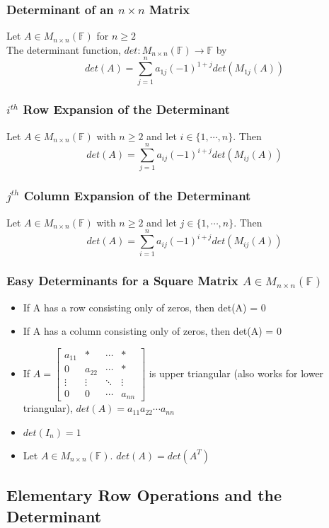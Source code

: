 \documentclass[12pt, letterpaper]{article}
\begin{document}
\subsubsection{Determinant of an $n\times n$ Matrix}
Let $A\in M_{n\times n}(\mathbb{F})$ for $n\geq2$ \\
The determinant function, $det: M_{n\times n}(\mathbb{F})\rightarrow\mathbb{F}$ by 
\[det(A) = \sum_{j=1}^{n}a_{1j}(-1)^{1+j}det(M_{1j}(A))\]
\subsubsection{$i^{th}$ Row Expansion of the Determinant}
Let $A\in M_{n\times n}(\mathbb{F})$ with $n\geq2$ and let $i\in\{1,\cdots,n\}$. Then
\[det(A) = \sum_{j=1}^{n}a_{ij}(-1)^{i+j}det(M_{ij}(A))\]
\subsubsection{$j^{th}$ Column Expansion of the Determinant}
Let $A\in M_{n\times n}(\mathbb{F})$ with $n\geq2$ and let $j\in\{1,\cdots,n\}$. Then
\[det(A) = \sum_{i=1}^{n}a_{ij}(-1)^{i+j}det(M_{ij}(A))\]
\subsubsection{Easy Determinants for a Square Matrix $A\in M_{n\times n}(\mathbb{F})$}
\begin{itemize}
    \item If A has a row consisting only of zeros, then det(A) = 0
    \item If A has a column consisting only of zeros, then det(A) = 0
    \item If $A = \begin{bmatrix} a_{11} &* &\cdots &* \\ 0 &a_{22} &\cdots &* \\ \vdots &\vdots &\ddots &\vdots \\ 0 &0 &\cdots &a_{nn} \end{bmatrix}$ is upper triangular (also works for lower triangular), $det(A) = a_{11}a_{22}\cdots a_{nn}$
    \item $det(I_n) = 1$
    \item Let $A\in M_{n\times n}(\mathbb{F})$. $det(A) = det(A^T)$
\end{itemize}
\subsection{Elementary Row Operations and the Determinant}
\end{document}
